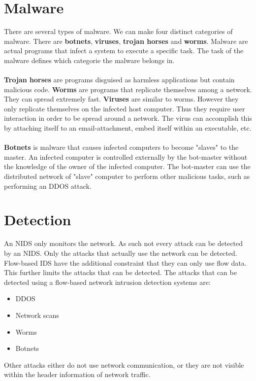 \section{Malware}
There are several types of malware. We can make four distinct categories of malware. There are \textbf{botnets}, \textbf{viruses}, \textbf{trojan horses} and \textbf{worms}. Malware are actual programs that infect a system to execute a specific task. The task of the malware defines which categorie the malware belongs in.\\
\\
\textbf{Trojan horses} are programs disguised as harmless applications but contain malicious code. \textbf{Worms} are programs that replicate themselves among a network.  They can spread extremely fast. \textbf{Viruses} are similar to worms. However they only replicate themselves on the infected host computer. Thus they require user interaction in order to be spread around a network. The virus can accomplish this by attaching itself to an email-attachment, embed itself within an executable, etc. \\
\\
\textbf{Botnets} is malware that causes infected computers to become "slaves" to the master. An infected computer is controlled externally by the bot-master without the knowledge of the owner of the infected computer. The bot-master can use the distributed network of "slave" computer to perform other malicious tasks, such as performing an DDOS attack.

\section{Detection}
An NIDS only monitors the network. As such not every attack can be detected by an NIDS. Only the attacks that actually use the network can be detected. Flow-based IDS have the additional constraint that they can only use flow data. This further limits the attacks that can be detected. The attacks that can be detected using a flow-based network intrusion detection systems are:
\begin{itemize}
\item DDOS
\item Network scans
\item Worms
\item Botnets
\end{itemize}
Other attacks either do not use network communication, or they are not visible within the header information of network traffic. 

